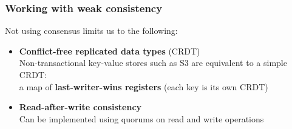 \documentclass[aspectratio=169]{beamer}
\begin{document}
\begin{frame}
	\frametitle{Working with weak consistency}
	Not using consensus limits us to the following:
	\vspace{2em}
	\begin{itemize}
		\item<2-> \textbf{Conflict-free replicated data types} (CRDT)\\
			\vspace{1em}
			{\footnotesize Non-transactional key-value stores such as S3 are equivalent to a simple CRDT:\\
			a map of \textbf{last-writer-wins registers} (each key is its own CRDT)}
			\vspace{1.5em}
		\item<3-> \textbf{Read-after-write consistency}\\
			\vspace{1em}
			{\footnotesize Can be implemented using quorums on read and write operations}
	\end{itemize}
\end{frame}
\end{document}
